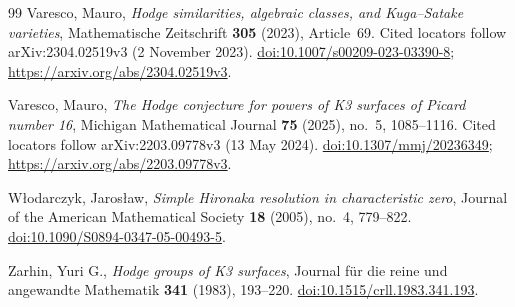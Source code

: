 \documentclass[11pt]{amsart}
\theoremstyle{definition}
\theoremstyle{remark}
\numberwithin{equation}{section}
\begin{document}
\begin{thebibliography}{99}
Varesco, Mauro, \emph{Hodge similarities, algebraic classes, and Kuga--Satake varieties}, Mathematische Zeitschrift \textbf{305} (2023), Article~69. Cited locators follow arXiv:2304.02519v3 (2 November 2023). \href{https://doi.org/10.1007/s00209-023-03390-8}{doi:10.1007/s00209-023-03390-8}; \url{https://arxiv.org/abs/2304.02519v3}.

Varesco, Mauro, \emph{The {Hodge} conjecture for powers of {K3} surfaces of {Picard} number 16}, Michigan Mathematical Journal \textbf{75} (2025), no.~5, 1085--1116. Cited locators follow arXiv:2203.09778v3 (13 May 2024). \href{https://doi.org/10.1307/mmj/20236349}{doi:10.1307/mmj/20236349}; \url{https://arxiv.org/abs/2203.09778v3}.

W{\l}odarczyk, Jaros{\l}aw, \emph{Simple {Hironaka} resolution in characteristic zero}, Journal of the American Mathematical Society \textbf{18} (2005), no.~4, 779--822. \href{https://doi.org/10.1090/S0894-0347-05-00493-5}{doi:10.1090/S0894-0347-05-00493-5}.

Zarhin, Yuri G., \emph{{Hodge} groups of {K3} surfaces}, Journal f{\"u}r die reine und angewandte Mathematik \textbf{341} (1983), 193--220. \href{https://doi.org/10.1515/crll.1983.341.193}{doi:10.1515/crll.1983.341.193}.

\end{thebibliography}
\end{document}
